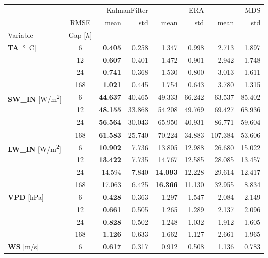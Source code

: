 \begin{table}
\centering
\caption{\CapTheTable}
\label{the_table}
\begin{tabular}{p{2.1cm}c|rr|rr|rr}
\toprule
 &  & \multicolumn{2}{r}{KalmanFilter} & \multicolumn{2}{r}{ERA} & \multicolumn{2}{r}{MDS} \\
 & RMSE & mean & std & mean & std & mean & std \\
Variable & Gap [$h$] &  &  &  &  &  &  \\
\midrule
\multirow[c]{4}{*}{\parbox{2.1cm}{\textbf{TA} [\si{°C}]}} & 6 & \bfseries 0.405 & 0.258 & 1.347 & 0.998 & 2.713 & 1.897 \\
 & 12 & \bfseries 0.607 & 0.401 & 1.472 & 0.901 & 2.942 & 1.748 \\
 & 24 & \bfseries 0.741 & 0.368 & 1.530 & 0.800 & 3.013 & 1.611 \\
 & 168 & \bfseries 1.021 & 0.445 & 1.754 & 0.643 & 3.780 & 1.315 \\
\cline{1-8}
\multirow[c]{4}{*}{\parbox{2.1cm}{\textbf{SW\_IN} [\si{W/m^2}]}} & 6 & \bfseries 44.637 & 40.465 & 49.333 & 66.242 & 63.537 & 85.402 \\
 & 12 & \bfseries 48.155 & 33.868 & 54.208 & 49.769 & 69.427 & 68.936 \\
 & 24 & \bfseries 56.564 & 30.043 & 65.950 & 40.931 & 86.771 & 59.604 \\
 & 168 & \bfseries 61.583 & 25.740 & 70.224 & 34.883 & 107.384 & 53.606 \\
\cline{1-8}
\multirow[c]{4}{*}{\parbox{2.1cm}{\textbf{LW\_IN} [\si{W/m^2}]}} & 6 & \bfseries 10.902 & 7.736 & 13.805 & 12.988 & 26.680 & 15.022 \\
 & 12 & \bfseries 13.422 & 7.735 & 14.767 & 12.585 & 28.085 & 13.457 \\
 & 24 & 14.594 & 7.840 & \bfseries 14.093 & 12.228 & 29.614 & 12.417 \\
 & 168 & 17.063 & 6.425 & \bfseries 16.366 & 11.130 & 32.955 & 8.834 \\
\cline{1-8}
\multirow[c]{4}{*}{\parbox{2.1cm}{\textbf{VPD} [\si{hPa}]}} & 6 & \bfseries 0.428 & 0.363 & 1.297 & 1.547 & 2.084 & 2.149 \\
 & 12 & \bfseries 0.661 & 0.505 & 1.265 & 1.289 & 2.137 & 2.096 \\
 & 24 & \bfseries 0.828 & 0.502 & 1.248 & 1.032 & 1.912 & 1.605 \\
 & 168 & \bfseries 1.126 & 0.633 & 1.662 & 1.127 & 2.661 & 1.965 \\
\cline{1-8}
\multirow[c]{4}{*}{\parbox{2.1cm}{\textbf{WS} [\si{m/s}]}} & 6 & \bfseries 0.617 & 0.317 & 0.912 & 0.508 & 1.136 & 0.783 \\

\end{tabular}
\end{table}
